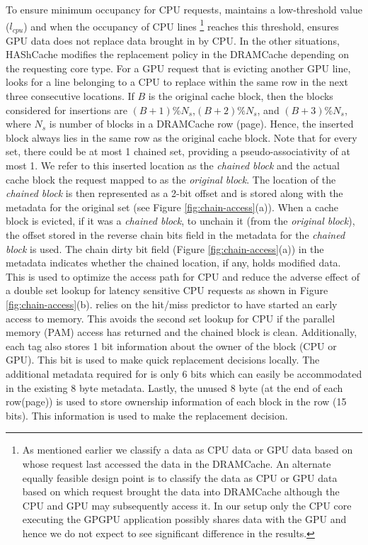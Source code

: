 To ensure minimum occupancy for CPU requests, \chaining maintains a low-threshold value (\textit{$l_{cpu}$}) and when the occupancy of CPU lines
\footnote{As mentioned earlier we classify a data as CPU data or GPU data based on whose request last accessed the data in the DRAMCache. An alternate equally feasible design point is to classify the data as CPU or GPU data based on which request brought the data into DRAMCache although the CPU and GPU may subsequently access it. In our setup only the CPU core executing the GPGPU application possibly shares data with the GPU and hence we do not expect to see significant difference in the results.} 
reaches this threshold, \chaining ensures GPU data does not replace data brought in by CPU. 
In the other situations, HAShCache modifies the replacement policy in the DRAMCache depending on the requesting core type. For a GPU request that is evicting another GPU line, \cachename looks for a line belonging to a CPU to replace within the same row in the next three consecutive locations.  
If $B$ is the original cache block, then the blocks considered for insertions are $(B+1)\%N_s$,$(B+2)\%N_s$, and $(B+3)\%N_s$, where $N_s$ is number of blocks in a DRAMCache row (page). Hence, the inserted block always lies in the same row as the original cache block. Note that for every set, there could be at most 1 chained set, providing a pseudo-associativity of at most 1.  
We refer to this inserted location as the \textit{chained block} and the actual cache block the request mapped to as the \textit{original block}. The location of the \textit{chained block} is then represented as a 2-bit offset and is stored along with the metadata for the original set (see Figure \ref{fig:chain-access}(a)). When a cache block is evicted, if it was a \textit{chained block}, to unchain it (from the \textit{original block}), the offset stored in the reverse chain bits field in the metadata for the \textit{chained block} is used.  
The chain dirty bit field (Figure \ref{fig:chain-access}(a)) in the metadata indicates whether the chained location, if any, holds modified data. This is used to optimize the access path for CPU and reduce the adverse effect of a double set lookup for latency sensitive CPU requests as shown in Figure \ref{fig:chain-access}(b). \chaining relies on the hit/miss predictor to have started an early access to memory. This avoids the second set lookup for CPU if the parallel memory (PAM) access has returned and the chained block is clean. 
Additionally, each tag also stores 1 bit information about the owner of the block (CPU or GPU). This bit is used to make quick replacement decisions locally. The additional metadata required for \chaining is only 6 bits which can easily be accommodated in the existing 8 byte metadata. Lastly, the unused 8 byte (at the end of each row(page)) is used to store ownership information of each block in the row (15 bits). This information is used to make the \chaining replacement decision.

